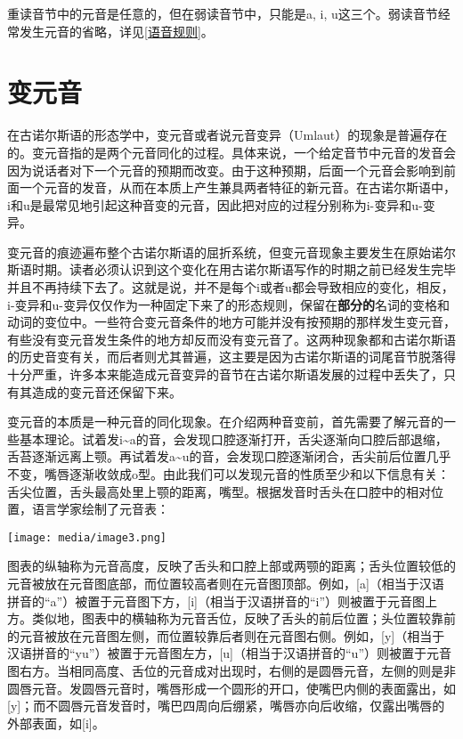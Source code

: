 重读音节中的元音是任意的，但在弱读音节中，只能是a, i,
u这三个。弱读音节经常发生元音的省略，详见\ref{语音规则}。

\section{变元音}\label{变元音}

在古诺尔斯语的形态学中，变元音或者说元音变异（Umlaut）的现象是普遍存在的。变元音指的是两个元音同化的过程。具体来说，一个给定音节中元音的发音会因为说话者对下一个元音的预期而改变。由于这种预期，后面一个元音会影响到前面一个元音的发音，从而在本质上产生兼具两者特征的新元音。在古诺尔斯语中，i和u是最常见地引起这种音变的元音，因此把对应的过程分别称为i-变异和u-变异。

变元音的痕迹遍布整个古诺尔斯语的屈折系统，但变元音现象主要发生在原始诺尔斯语时期。读者必须认识到这个变化在用古诺尔斯语写作的时期之前已经发生完毕并且不再持续下去了。这就是说，并不是每个i或者u都会导致相应的变化，相反，i-变异和u-变异仅仅作为一种固定下来了的形态规则，保留在\textbf{部分的}名词的变格和动词的变位中。一些符合变元音条件的地方可能并没有按预期的那样发生变元音，有些没有变元音发生条件的地方却反而没有变元音了。这两种现象都和古诺尔斯语的历史音变有关，而后者则尤其普遍，这主要是因为古诺尔斯语的词尾音节脱落得十分严重，许多本来能造成元音变异的音节在古诺尔斯语发展的过程中丢失了，只有其造成的变元音还保留下来。

变元音的本质是一种元音的同化现象。在介绍两种音变前，首先需要了解元音的一些基本理论。试着发i\textasciitilde a的音，会发现口腔逐渐打开，舌尖逐渐向口腔后部退缩，舌苔逐渐远离上颚。再试着发a\textasciitilde u的音，会发现口腔逐渐闭合，舌尖前后位置几乎不变，嘴唇逐渐收敛成o型。由此我们可以发现元音的性质至少和以下信息有关：舌尖位置，舌头最高处里上颚的距离，嘴型。根据发音时舌头在口腔中的相对位置，语言学家绘制了元音表：

\texttt{[image: media/image3.png]}

图表的纵轴称为元音高度，反映了舌头和口腔上部或两颚的距离；舌头位置较低的元音被放在元音图底部，而位置较高者则在元音图顶部。例如，{[}a{]}（相当于汉语拼音的``a''）被置于元音图下方，{[}i{]}（相当于汉语拼音的``i''）则被置于元音图上方。类似地，图表中的横轴称为元音舌位，反映了舌头的前后位置；头位置较靠前的元音被放在元音图左侧，而位置较靠后者则在元音图右侧。例如，{[}y{]}（相当于汉语拼音的``yu''）被置于元音图左方，{[}u{]}（相当于汉语拼音的``u''）则被置于元音图右方。当相同高度、舌位的元音成对出现时，右侧的是圆唇元音，左侧的则是非圆唇元音。发圆唇元音时，嘴唇形成一个圆形的开口，使嘴巴内侧的表面露出，如{[}y{]}；而不圆唇元音发音时，嘴巴四周向后绷紧，嘴唇亦向后收缩，仅露出嘴唇的外部表面，如{[}i{]}。

